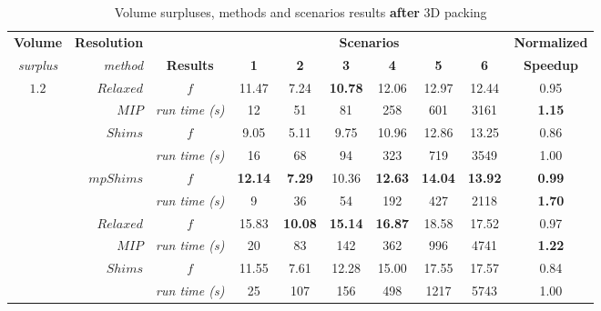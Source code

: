 \documentclass[preprint,authoryear]{elsarticle}
\begin{document}
\vspace{2.0mm}
\begin{table}[H]
	\centering
	\caption{Volume surpluses, methods and scenarios results {\bf after} 3D packing}  \label{tab:results2}
	\footnotesize
	\begin{tabular}{crcccccccc}
		\toprule
		{\bf Volume}     &{\bf Resolution}&                    &\multicolumn{6}{c}{\bf Scenarios}                                                   &{\bf Normalized}\\
		\cmidrule{4-9}		
		{\it surplus}    &{\it method}    & {\bf Results}      &{\bf 1}    &{\bf 2}    &{\bf 3}    &{\bf 4}    &{\bf 5}    &{\bf 6}    &{\bf Speedup} \\
		\toprule
		\multirow{7}{*}{$1.2$}&$Relaxed$  & $f$                &   11.47   &    7.24   &{\bf 10.78}&     12.06 &     12.97 &    12.44  &     0.95 \\%
		&                       $MIP$     & {\it run time (s)} &     12     &     51    &     81    &     258   &      601  &     3161  &{\bf 1.15}\\%
		\cmidrule{2-10}		                       
		&\multirow{2}{*}{ $Shims$}        & $f$                &    9.05   &   5.11    &   9.75    &   10.96   &   12.86   &   13.25   &     0.86 \\%
		&                                 & {\it run time (s)} &     16    &     68    &     94    &    323    &    719    &    3549   &     1.00 \\%
		\cmidrule{2-10}		                       
		&\multirow{2}{*}{ $mpShims$}      & $f$                &{\bf 12.14}&{\bf 7.29} &   10.36   &{\bf 12.63}&{\bf 14.04}&{\bf 13.92}&{\bf 0.99}\\%
		&                                 & {\it run time (s)} &     9     &     36    &     54    &     192   &     427   &    2118   &{\bf 1.70}\\%
		\toprule		
		\multirow{7}{*}{$1.5$}&$Relaxed$  & $f$                &     15.83 &{\bf 10.08}&{\bf 15.14}&{\bf 16.87}&     18.58 &     17.52 &     0.97 \\%
		&                      $MIP$      & {\it run time (s)} &    20     &     83    &     142   &     362   &     996   &     4741  &{\bf 1.22} \\%
		\cmidrule{2-10}		                       
		&\multirow{2}{*}{ $Shims$}        & $f$                &   11.55   &   7.61    &   12.28   &   15.00   &   17.55   &   17.57   &     0.84  \\%
		&                                 & {\it run time (s)} &    25     &    107    &     156   &    498    &    1217   &   5743    &     1.00  \\%

\end{tabular}
\end{table}
\end{document}
